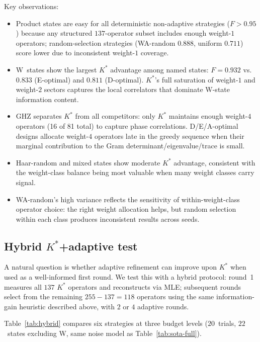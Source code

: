 \documentclass[twocolumn,prx,aps,superscriptaddress,longbibliography]{revtex4-2}
\begin{document}
Key observations:
\begin{itemize}
\item Product states are easy for all deterministic non-adaptive strategies
($F > 0.95$) because any structured $137$-operator subset includes enough
weight-$1$ operators; random-selection strategies (WA-random $0.888$,
uniform $0.711$) score lower due to inconsistent weight-$1$ coverage.
\item W~states show the largest $K^*$ advantage among named states:
$F = 0.932$ vs.\ $0.833$ (E-optimal) and $0.811$ (D-optimal).
$K^*$'s full saturation of weight-$1$ and weight-$2$ sectors captures the
local correlators that dominate W-state information content.
\item GHZ separates $K^*$ from all competitors: only $K^*$ maintains
enough weight-$4$ operators (16 of 81 total) to capture phase
correlations. D/E/A-optimal designs allocate weight-$4$ operators
late in the greedy sequence when their marginal contribution to
the Gram determinant/eigenvalue/trace is small.
\item Haar-random and mixed states show moderate $K^*$ advantage,
consistent with the weight-class balance
being most valuable when many weight classes carry signal.
\item WA-random's high variance reflects the sensitivity of
within-weight-class operator choice: the right weight allocation
helps, but random selection within each class produces inconsistent
results across seeds.
\end{itemize}

\subsection{Hybrid $K^*$+adaptive test}
\label{sec:hybrid-test}

A natural question is whether adaptive refinement can improve upon
$K^*$ when used as a well-informed first round.  We test this with
a hybrid protocol: round~1 measures all $137$ $K^*$ operators and
reconstructs via MLE; subsequent rounds select from the remaining
$255 - 137 = 118$ operators using the same information-gain
heuristic described above, with $2$ or $4$ adaptive rounds.

Table~\ref{tab:hybrid} compares six strategies at three budget
levels ($20$~trials, $22$~states excluding W, same noise model as
Table~\ref{tab:sota-full}).
\end{document}

